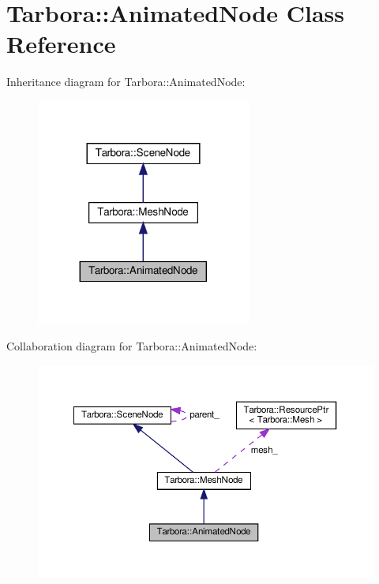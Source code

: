 \hypertarget{classTarbora_1_1AnimatedNode}{}\section{Tarbora\+:\+:Animated\+Node Class Reference}
\label{classTarbora_1_1AnimatedNode}


Inheritance diagram for Tarbora\+:\+:Animated\+Node\+:
\nopagebreak
\begin{figure}[H]
\begin{center}
\leavevmode
\includegraphics[width=200pt]{classTarbora_1_1AnimatedNode__inherit__graph}
\end{center}
\end{figure}


Collaboration diagram for Tarbora\+:\+:Animated\+Node\+:
\nopagebreak
\begin{figure}[H]
\begin{center}
\leavevmode
\includegraphics[width=350pt]{classTarbora_1_1AnimatedNode__coll__graph}
\end{center}
\end{figure}
